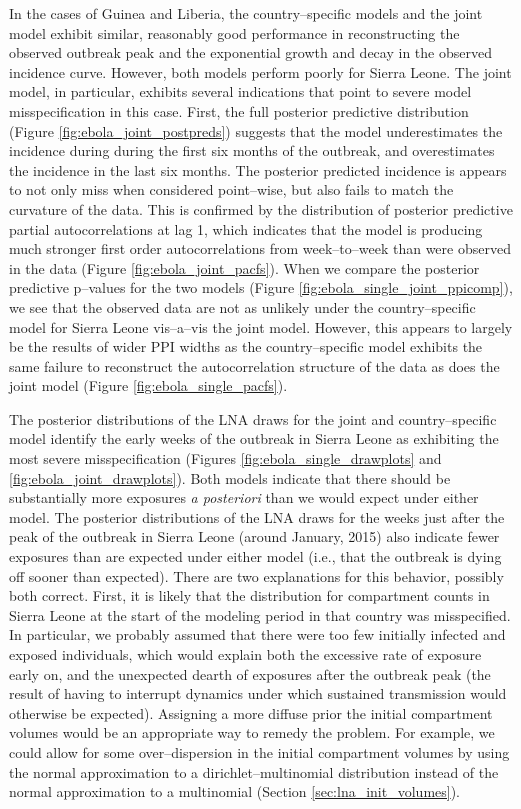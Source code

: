 In the cases of Guinea and Liberia, the country--specific models and the joint model exhibit similar, reasonably good performance in reconstructing the observed outbreak peak and the exponential growth and decay in the observed incidence curve. However, both models perform poorly for Sierra Leone. The joint model, in particular, exhibits several indications that point to severe model misspecification in this case.  First, the full posterior predictive distribution (Figure \ref{fig:ebola_joint_postpreds}) suggests that the model underestimates the incidence during during the first six months of the outbreak, and overestimates the incidence in the last six months. The posterior predicted incidence is appears to not only miss when considered point--wise, but also fails to match the curvature of the data. This is confirmed by the distribution of posterior predictive partial autocorrelations at lag 1, which indicates that the model is producing much stronger first order autocorrelations from week--to--week than were observed in the data (Figure \ref{fig:ebola_joint_pacfs}). When we compare the posterior predictive p--values for the two models (Figure \ref{fig:ebola_single_joint_ppicomp}), we see that the observed data are not as unlikely under the country--specific model for Sierra Leone vis--a--vis the joint model. However, this appears to largely be the results of wider PPI widths as the country--specific model exhibits the same failure to reconstruct the autocorrelation structure of the data as does the joint model (Figure \ref{fig:ebola_single_pacfs}). 

The posterior distributions of the LNA draws for the joint and country--specific model identify the early weeks of the outbreak in Sierra Leone as exhibiting the most severe misspecification (Figures \ref{fig:ebola_single_drawplots} and \ref{fig:ebola_joint_drawplots}). Both models indicate that there should be substantially more exposures \textit{a posteriori} than we would expect under either model. The posterior distributions of the LNA draws for the weeks just after the peak of the outbreak in Sierra Leone (around January, 2015) also indicate fewer exposures than are expected under either model (i.e., that the outbreak is dying off sooner than expected). There are two explanations for this behavior, possibly both correct. First, it is likely that the distribution for compartment counts in Sierra Leone at the start of the modeling period in that country was misspecified. In particular, we probably assumed that there were too few initially infected and exposed individuals, which would explain both the excessive rate of exposure early on, and the unexpected dearth of exposures after the outbreak peak (the result of having to interrupt dynamics under which sustained transmission would otherwise be expected). Assigning a more diffuse prior the initial compartment volumes would be an appropriate way to remedy the problem. For example, we could allow for some over--dispersion in the initial compartment volumes by using the normal approximation to a dirichlet--multinomial distribution instead of the normal approximation to a multinomial (Section \ref{sec:lna_init_volumes}). 

